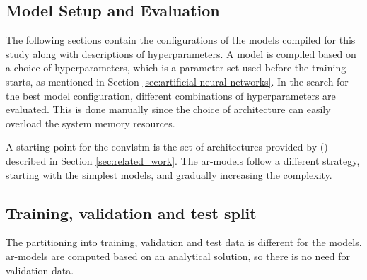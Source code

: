 \subsection{Model Setup and Evaluation}
The following sections contain the configurations of the models compiled for this study along with descriptions of hyperparameters. A model is compiled based on a choice of hyperparameters, which is a parameter set used before the training starts, as mentioned in Section \ref{sec:artificial neural networks}. In the search for the best model configuration, different combinations of hyperparameters are evaluated. This is done manually since the choice of architecture can easily overload the system memory resources.
 
A starting point for the \acrshort{convlstm} is the set of architectures provided by \citeauthor{SunAirLSTM} (\citeyear{SunAirLSTM}) described in Section \ref{sec:related_work}. The \acrshort{ar}-models follow a different strategy, starting with the simplest models, and gradually increasing the complexity. %

\subsection{Training, validation and test split}
The partitioning into training, validation and test data is different for the models. \acrshort{ar}-models are computed based on an analytical solution, so there is no need for validation data. 

